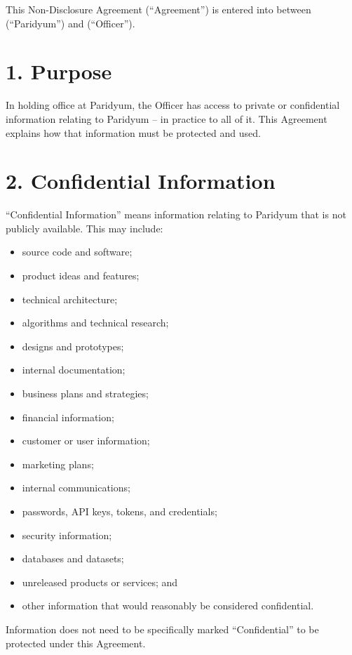 \documentclass{paridyum}
\begin{document}
\paridyumletterhead
\paridyumdateref{\dkDocDate}{\dkDocRef}

This Non-Disclosure Agreement (``Agreement'') is entered into between
\textbf{\dkOrgName} (``Paridyum'') and \textbf{\dkPIdentityLegalName} (``Officer'').

\section*{1. Purpose}
In holding office at Paridyum, the Officer has access to private or confidential
information relating to Paridyum -- in practice to all of it. This Agreement explains
how that information must be protected and used.

\section*{2. Confidential Information}
``Confidential Information'' means information relating to Paridyum that is not
publicly available. This may include:
\begin{itemize}[leftmargin=*, noitemsep]
    \item source code and software;
    \item product ideas and features;
    \item technical architecture;
    \item algorithms and technical research;
    \item designs and prototypes;
    \item internal documentation;
    \item business plans and strategies;
    \item financial information;
    \item customer or user information;
    \item marketing plans;
    \item internal communications;
    \item passwords, API keys, tokens, and credentials;
    \item security information;
    \item databases and datasets;
    \item unreleased products or services; and
    \item other information that would reasonably be considered confidential.
\end{itemize}
Information does not need to be specifically marked ``Confidential'' to be
protected under this Agreement.
\end{document}
